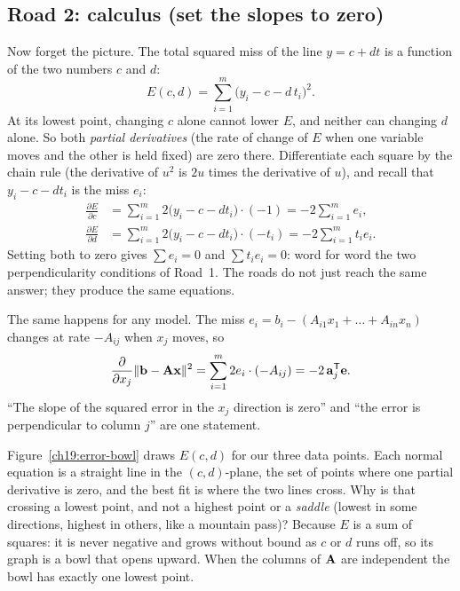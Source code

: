 \subsection*{Road 2: calculus (set the slopes to zero)}

Now forget the picture. The total squared miss of the line $y=c+dt$ is a function of the two numbers
$c$ and $d$:
\[
  E(c,d) = \sum_{i=1}^m \bigl(y_i - c - d\,t_i\bigr)^2 .
\]
At its lowest point, changing $c$ alone cannot lower $E$, and neither can changing $d$ alone. So
both \emph{partial derivatives} (the rate of change of $E$ when one variable moves and the other is
held fixed) are zero there. Differentiate each square by the chain rule (the derivative of $u^2$ is
$2u$ times the derivative of $u$), and recall that $y_i-c-dt_i$ is the miss $e_i$:
\begin{align*}
  \frac{\partial E}{\partial c}
    &= \sum_{i=1}^m 2\bigl(y_i-c-dt_i\bigr)\cdot(-1) = -2\sum_{i=1}^m e_i,\\
  \frac{\partial E}{\partial d}
    &= \sum_{i=1}^m 2\bigl(y_i-c-dt_i\bigr)\cdot(-t_i) = -2\sum_{i=1}^m t_i e_i .
\end{align*}
Setting both to zero gives $\sum e_i=0$ and $\sum t_ie_i=0$: word for word the two
perpendicularity conditions of Road~1. The roads do not just reach the same answer; they produce
the same equations.

The same happens for any model. The miss $e_i=b_i-(A_{i1}x_1+\dots+A_{in}x_n)$ changes at rate
$-A_{ij}$ when $x_j$ moves, so
\[
  \frac{\partial}{\partial x_j}\lVert\mathbf{b}-\mathbf{A}\mathbf{x}\rVert^2
  = \sum_{i=1}^m 2e_i\cdot(-A_{ij})
  = -2\,\mathbf{a}_j^{\mathsf{T}}\mathbf{e}.
\]
``The slope of the squared error in the $x_j$ direction is zero'' and ``the error is perpendicular
to column $j$'' are one statement.

Figure~\ref{ch19:error-bowl} draws $E(c,d)$ for our three data points. Each normal equation is a
straight line in the $(c,d)$-plane, the set of points where one partial derivative is zero, and
the best fit is where the two lines cross. Why is that crossing a lowest point, and not a highest
point or a \emph{saddle} (lowest in some directions, highest in others, like a mountain pass)?
Because $E$ is a sum of squares: it is never negative and grows without bound as $c$ or $d$ runs
off, so its graph is a bowl that opens upward. When the columns of $\mathbf{A}$ are independent the
bowl has exactly one lowest point.

